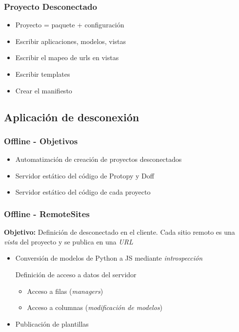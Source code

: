 \documentclass{beamer}
\begin{document}
\begin{frame}
    \frametitle{Proyecto Desconectado}
    \begin{itemize}
        \item{Proyecto = paquete + configuración}
        \item{Escribir aplicaciones, modelos, vistas}
        \item{Escribir el mapeo de urls en vistas}
        \item{Escribir templates}
        \item{Crear el manifiesto}
    \end{itemize}
\end{frame}

\subsection{Aplicación de desconexión}
\begin{frame}
    \frametitle{Offline - Objetivos}
    \begin{itemize}
        \item{Automatización de creación de proyectos desconectados}
        \item{Servidor estático del código de Protopy y Doff}
        \item{Servidor estático del código de cada proyecto}
    \end{itemize}
\end{frame}

\begin{frame}

    \frametitle{Offline - RemoteSites}
    \par{
        \par{\bf Objetivo:}
        Definición de desconectado en el cliente. Cada sitio remoto es una {\it vista}
        del proyecto y se publica en una {\it URL}

    }
    \begin{itemize}
      \item{Conversión de modelos de Python a JS mediante {\it introspección}}
      \begin{item}Definición de acceso a datos del servidor
        \begin{itemize}
          \item {Acceso a filas ({\it managers})}
          \item {Acceso a columnas ({\it modificación de modelos})}
        \end{itemize}
      \end{item}
      \item{Publicación de plantillas}
    \end{itemize}

\end{frame}
\end{document}
